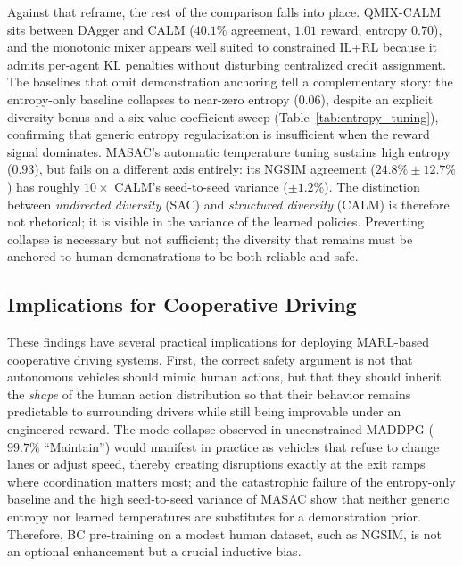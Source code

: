 \documentclass[journal]{IEEEtran}
\begin{document}
Against that reframe, the rest of the comparison falls into place. QMIX-CALM sits between DAgger and CALM ($40.1\%$ agreement, $1.01$ reward, entropy $0.70$), and the monotonic mixer appears well suited to constrained IL+RL because it admits per-agent KL penalties without disturbing centralized credit assignment. The baselines that omit demonstration anchoring tell a complementary story: the entropy-only baseline collapses to near-zero entropy ($0.06$), despite an explicit diversity bonus and a six-value coefficient sweep (Table~\ref{tab:entropy_tuning}), confirming that generic entropy regularization is insufficient when the reward signal dominates. MASAC's automatic temperature tuning sustains high entropy ($0.93$), but fails on a different axis entirely: its NGSIM agreement ($24.8\% \pm 12.7\%$) has roughly $10\times$ CALM's seed-to-seed variance ($\pm 1.2\%$). The distinction between \emph{undirected diversity} (SAC) and \emph{structured diversity} (CALM) is therefore not rhetorical; it is visible in the variance of the learned policies. Preventing collapse is necessary but not sufficient; the diversity that remains must be anchored to human demonstrations to be both reliable and safe.

\subsection{Implications for Cooperative Driving}

These findings have several practical implications for deploying MARL-based cooperative driving systems. First, the correct safety argument is not that autonomous vehicles should mimic human actions, but that they should inherit the \emph{shape} of the human action distribution so that their behavior remains predictable to surrounding drivers while still being improvable under an engineered reward. The mode collapse observed in unconstrained MADDPG ($99.7\%$ ``Maintain'') would manifest in practice as vehicles that refuse to change lanes or adjust speed, thereby creating disruptions exactly at the exit ramps where coordination matters most; and the catastrophic failure of the entropy-only baseline and the high seed-to-seed variance of MASAC show that neither generic entropy nor learned temperatures are substitutes for a demonstration prior. Therefore, BC pre-training on a modest human dataset, such as NGSIM, is not an optional enhancement but a crucial inductive bias.
\end{document}
